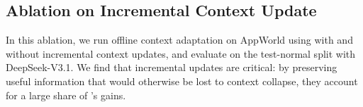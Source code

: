 \begin{table}
  \centering
  \small
  \caption{\textbf{Robustness to Noisy or Harmful Reflector Feedback on FiNER.} We invoke a harmful reflector once every $X$ adaptation steps. Parentheses report deltas vs.\ the base LLM.}
  \label{tab:harmful-reflector-frequency}
\end{table}

\subsection{Ablation on Incremental Context Update}
\label{subsec:incremental-update-ablation}

In this ablation, we run offline context adaptation on AppWorld using \name with and without incremental context updates, and evaluate on the test-normal split with DeepSeek-V3.1.
We find that incremental updates are critical: by preserving useful information that would otherwise be lost to context collapse, they account for a large share of \name’s gains.

